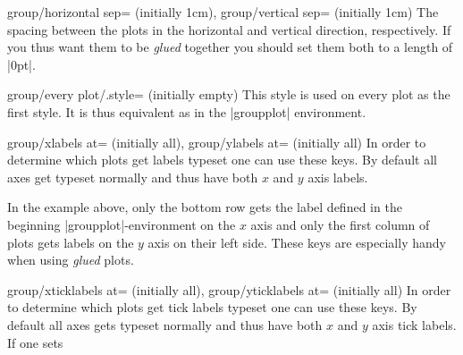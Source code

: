 {\begin{pgfplotskeylist}{group/horizontal sep= (initially 1cm),
      group/vertical sep= (initially 1cm)}
  The spacing between the plots in the horizontal and vertical direction, respectively. If you thus want them to be \textit{glued} together you should set
  them both to a length of |0pt|.
\end{pgfplotskeylist}

\begin{pgfplotskey}{group/every plot/.style= (initially empty)}
      This style is used on every plot as the first style. It is thus equivalent as  in the |groupplot| environment.
\end{pgfplotskey}

\begin{pgfplotskeylist}{%
	group/xlabels at= (initially all),%
	group/ylabels at= (initially all)}
  In order to determine which plots get labels typeset one can use these keys. By default all axes get typeset normally and thus have both $x$ and
  $y$ axis labels. 
\begin{codeexample}[]
\end{codeexample}
In the example above, only the bottom row gets the label defined in the beginning |groupplot|-environment on the $x$ axis and only the first column of plots gets labels on the
$y$ axis on their left side. These keys are especially handy when using \textit{glued} plots.
\end{pgfplotskeylist}

\begin{pgfplotskeylist}{%
	group/xticklabels at= (initially all),%
	group/yticklabels at= (initially all)}
  In order to determine which plots get tick labels typeset one can use these keys. By default all axes gets typeset normally and thus have both $x$ and
  $y$ axis tick labels. If one sets


\end{pgfplotskeylist}}
